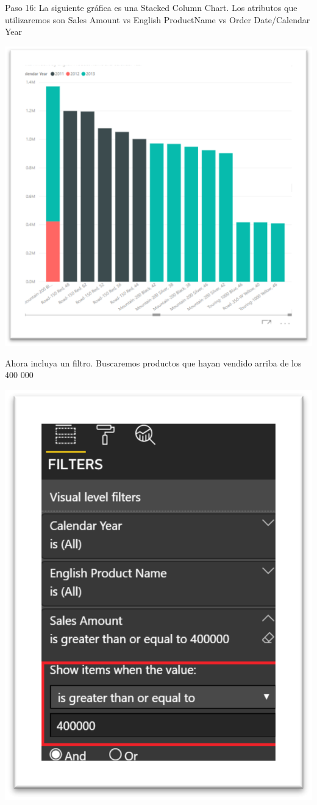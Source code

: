 \documentclass[12pt,letterpaper]{article}
\begin{document}
Paso 16: La siguiente gráfica es una Stacked Column Chart. Los atributos que utilizaremos son Sales Amount vs English ProductName vs Order Date/Calendar Year
\begin{center}
    \includegraphics[width=16cm]{img/18.png}  
\end{center}
Ahora incluya un filtro. Buscaremos productos que hayan vendido arriba de los 400 000
\begin{center}
    \includegraphics[width=16cm]{img/19.png}  
\end{center}
\end{document}
